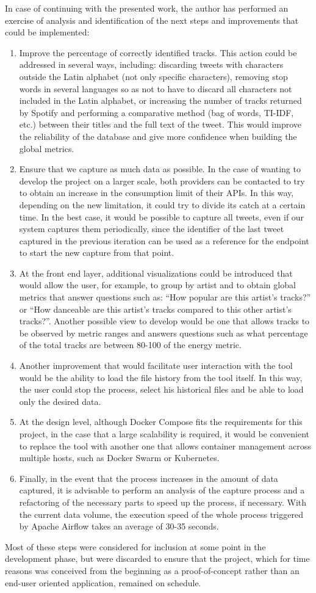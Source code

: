 \nonzeroparskip In case of continuing with the presented work, the author has performed an exercise of analysis and identification of the next steps and improvements that could be implemented:
\begin{enumerate}
	\item Improve the percentage of correctly identified tracks. This action could be addressed in several ways, including: discarding tweets with characters outside the Latin alphabet (not only specific characters), removing stop words in several languages so as not to have to discard all characters not included in the Latin alphabet, or increasing the number of tracks returned by Spotify and performing a comparative method (bag of words, TI-IDF, etc.) between their titles and the full text of the tweet. This would improve the reliability of the database and give more confidence when building the global metrics.
	\item Ensure that we capture as much data as possible. In the case of wanting to develop the project on a larger scale, both providers can be contacted to try to obtain an increase in the consumption limit of their APIs. In this way, depending on the new limitation, it could try to divide its catch at a certain time. In the best case, it would be possible to capture all tweets, even if our system captures them periodically, since the identifier of the last tweet captured in the previous iteration can be used as a reference for the endpoint to start the new capture from that point.
	\item At the front end layer, additional visualizations could be introduced that would allow the user, for example, to group by artist and to obtain global metrics that answer questions such as: ``How popular are this artist's tracks?'' or ``How danceable are this artist's tracks compared to this other artist's tracks?''. Another possible view to develop would be one that allows tracks to be observed by metric ranges and answers questions such as what percentage of the total tracks are between 80-100 of the energy metric.
	\item Another improvement that would facilitate user interaction with the tool would be the ability to load the file history from the tool itself. In this way, the user could stop the process, select his historical files and be able to load only the desired data.
	\item At the design level, although Docker Compose fits the requirements for this project, in the case that a large scalability is required, it would be convenient to replace the tool with another one that allows container management across multiple hosts, such as Docker Swarm or Kubernetes.
	\item Finally, in the event that the process increases in the amount of data captured, it is advisable to perform an analysis of the capture process and a refactoring of the necessary parts to speed up the process, if necessary. With the current data volume, the execution speed of the whole process triggered by Apache Airflow takes an average of 30-35 seconds.
\end{enumerate}

\nonzeroparskip Most of these steps were considered for inclusion at some point in the development phase, but were discarded to ensure that the project, which for time reasons was conceived from the beginning as a proof-of-concept rather than an end-user oriented application, remained on schedule.